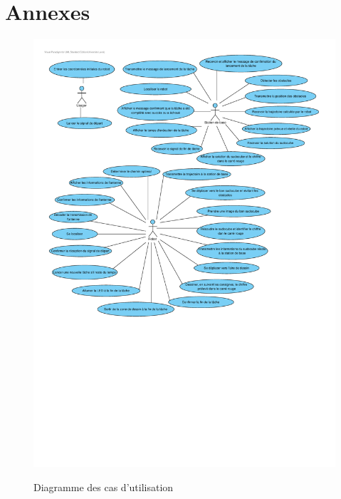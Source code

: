
\chapter{Annexes}
\label{s:annexes}

\begin{figure}
  \caption{Diagramme des cas d'utilisation}
  \centering
  \includegraphics[width=15cm]{fig/use_cases_diagram.pdf}
  \label{use_cases_diagram}
\end{figure}



